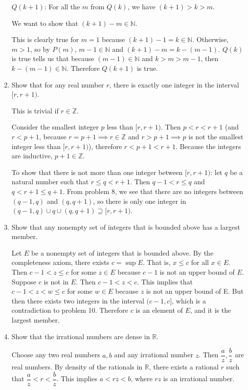 \documentclass[a4paper,10pt]{book}
\theoremstyle{plain} %
\begin{document}
\begin{enumerate}
	$Q(k+1)$: For all the $m$ from $Q(k)$, we have $(k+1)>k>m$.\par
	We want to show that $(k+1)-m \in \mathbb{N}$.\par
	This is clearly true for $m=1$ because $(k+1)-1 = k \in \mathbb{N}$. 
	Otherwise, $m>1$, so by $P(m)$, $m-1 \in \mathbb{N}$ and $(k+1)-m = k -(m-1)$.
	$Q(k)$ is true tells us that because $(m-1) \in \mathbb{N}$ and $k>m>m-1$, then $k-(m-1) \in \mathbb{N}$.
	Therefore $Q(k+1)$ is true.
	\item Show that for any real number $r$, there is exactly one integer in the interval $[r,r+1)$.\par
	This is trivial if $r \in \mathbb{Z}$.\par
	Consider the smallest integer $p$ less than $[r,r+1)$.
	Then $p<r<r+1$ (and $r<p+1$, because $r=p+1 \implies r \in \mathbb{Z}$ and $r>p+1 \implies p$ is not the smallest integer less than $[r,r+1)$), therefore $r<p+1<r+1$. Because the integers are inductive, $p+1 \in \mathbb{Z}$.\par
	To show that there is not more than one integer between $[r,r+1)$:
	let $q$ be a natural number such that $r \le q < r+1$. Then $q-1 < r \le q$ and $q< r+1 \le q+1$. 
	From problem 8, we see that there are no integers between $(q-1,q)$ and $(q,q+1)$, 
	so there is only one integer in $(q-1,q)\cup q \cup (q,q+1) \supseteq [r,r+1)$.
	\item Show that any nonempty set of integers that is bounded above has a largest member.\par
	Let $E$ be a nonempty set of integers that is bounded above. By the completeness axiom, there exists $c = \sup E$. 
	That is, $x\le c$ for all $x \in E$. Then $c-1 < z \le c$ for some $z \in E$ because $c-1$ is not an upper bound of $E$.
	Suppose $c$ is not in $E$. Then $c-1 < z < c$. 
	This implies that $c-1 < z < w \le c$ for some $w \in E$ because $z$ is not an upper bound of E.
	But then there exists two integers in the interval $(c-1,c]$, which is a contradiction to problem 10.
	Therefore $c$ is an element of $E$, and it is the largest member.
	\item Show that the irrational numbers are dense in $\mathbb{R}$.\par
	Choose any two real numbers $a,b$ and any irrational number $z$. Then $\dfrac{a}{z},\dfrac{b}{z}$ are real numbers. 
	By density of the rationals in $\mathbb{R}$, there exists a rational $r$ such that $\dfrac{a}{z}<r<\dfrac{b}{z}$. This implies $a<rz<b$, where $rz$ is an irrational number.\par

\end{enumerate}
\end{document}
